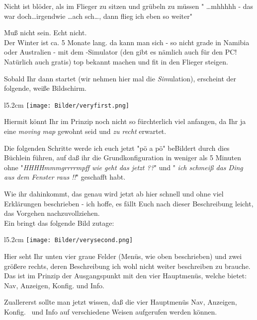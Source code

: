 Nicht ist blöder, als im Flieger zu sitzen und grübeln zu müssen " \dots  mhhhhh -  das war doch\dots  irgendwie \dots ach sch\dots , dann flieg ich eben so weiter"

Muß nicht sein. Echt nicht.\\[0.75em]

Der Winter ist ca. 5 Monate lang. da kann man sich - so nicht grade in Namibia oder Australien - mit dem \xc -Simulator (den gibt es nämlich auch für den PC! Natürlich auch gratis) top bekannt machen und fit in den Flieger steigen.

Sobald Ihr \xc dann startet (wir nehmen hier mal die \textsl{Sim}ulation), erscheint der folgende, weiße Bildschirm.

\begin{wrapfigure}{l}{5.2cm}
\texttt{[image: Bilder/veryfirst.png]}
\end{wrapfigure}


Hiermit könnt Ihr im Prinzip noch nicht so fürchterlich viel anfangen, da Ihr ja eine \textsl{moving map} gewohnt seid und \textsl{zu recht} erwartet.

Die folgenden Schritte werde ich euch jetzt "pö a pö" beBildert durch dies Büchlein führen, auf daß ihr die Grundkonfiguration in weniger als 5 Minuten ohne "\textsl{HHHHmmmgrrrrmpff wie geht das jetzt ??}"  und " \textsl{ich schmeiß das Ding aus  dem Fenster raus !!}"  geschafft habt.

 Wie ihr dahinkommt, das genau wird jetzt ab hier schnell und ohne viel Erklärungen beschrieben  - ich hoffe, es fällt Euch nach dieser Beschreibung leicht, das Vorgehen nachzuvollziehen.\\

Ein \dklick bringt das folgende Bild zutage:

\begin{wrapfigure}{l}{5.2cm}
\texttt{[image: Bilder/verysecond.png]}
\end{wrapfigure}

Hier seht Ihr unten vier graue Felder (Menüs, wie  oben beschrieben) und zwei größere rechts, deren Beschreibung ich  wohl nicht weiter beschreiben zu brauche. Das ist im Prinzip der Ausgangspunkt mit den vier Hauptmenüs, welche \xc bietet: \textsf{Nav}, \textsf{Anzeigen},\textsf{ Konfig.} und \textsf{Info}.

Zuallererst sollte man jetzt wissen, daß die vier Hauptmenüs \textsf{Nav}, \textsf{Anzeigen}, \textsf{Konfig.\ } und \textsf{Info} auf verschiedene Weisen aufgerufen werden können.\\

